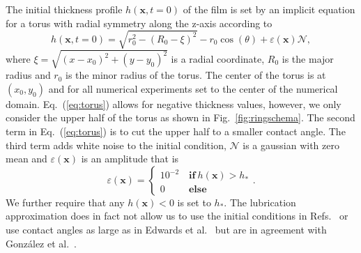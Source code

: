 \documentclass[twoside,twocolumn,9pt]{article}
\begin{document}
The initial thickness profile $h(\mathbf{x}, t=0)$ of the film is set by an implicit equation for a torus with radial symmetry along the z-axis according to
\begin{equation}\label{eq:torus}
    h(\mathbf{x}, t=0) = \sqrt{r_0^2 - \left(R_0-\xi\right)^2} - r_0\cos(\theta) + \varepsilon(\mathbf{x})\mathcal{N},
\end{equation}
where $\xi = \sqrt{(x-x_0)^2+(y-y_0)^2}$ is a radial coordinate, $R_0$ is the major radius and $r_0$ is the minor radius of the torus.
The center of the torus is at $(x_0,y_0)$ and for all numerical experiments set to the center of the numerical domain.
Eq.~(\ref{eq:torus}) allows for negative thickness values, however, we only consider the upper half of the torus as shown in Fig.~\ref{fig:ringschema}. 
The second term in Eq.~(\ref{eq:torus}) is to cut the upper half to a smaller contact angle.
The third term adds white noise to the initial condition, $\mathcal{N}$ is a gaussian with zero mean and $\varepsilon(\mathbf{x})$ is an amplitude that is 
\begin{equation}
    \varepsilon(\mathbf{x}) =
    \begin{cases}
        10^{-2}\quad \textbf{if}~h(\mathbf{x}) > h_{\ast}\\
        0~~\quad\quad \textbf{else}
    \end{cases}
    .
\end{equation} 
We further require that any $h(\mathbf{x}) < 0$ is set to $h_{\ast}$.
The lubrication approximation does in fact not allow us to use the initial conditions in Refs.~\cite{nguyenCompetitionCollapseBreakup2012, wuBreakupPatternedNanoscale2010} or use contact angles as large as in Edwards et al.~\cite{edwardsControllingBreakupToroidal2021} but are in agreement with Gonz{\'a}lez et al.~\cite{gonzalezStabilityLiquidRing2013}.
\end{document}
